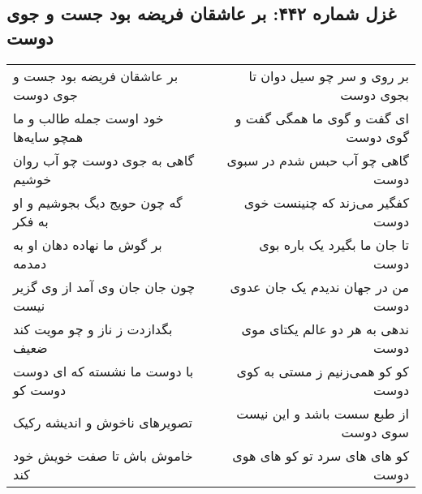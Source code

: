 \begin{center}
\section*{غزل شماره ۴۴۲: بر عاشقان فریضه بود جست و جوی دوست}
\label{sec:0442}
\begin{longtable}{l p{0.5cm} r}
بر عاشقان فریضه بود جست و جوی دوست
&&
بر روی و سر چو سیل دوان تا بجوی دوست
\\
خود اوست جمله طالب و ما همچو سایه‌ها
&&
ای گفت و گوی ما همگی گفت و گوی دوست
\\
گاهی به جوی دوست چو آب روان خوشیم
&&
گاهی چو آب حبس شدم در سبوی دوست
\\
گه چون حویج دیگ بجوشیم و او به فکر
&&
کفگیر می‌زند که چنینست خوی دوست
\\
بر گوش ما نهاده دهان او به دمدمه
&&
تا جان ما بگیرد یک باره بوی دوست
\\
چون جان جان وی آمد از وی گزیر نیست
&&
من در جهان ندیدم یک جان عدوی دوست
\\
بگدازدت ز ناز و چو مویت کند ضعیف
&&
ندهی به هر دو عالم یکتای موی دوست
\\
با دوست ما نشسته که ای دوست دوست کو
&&
کو کو همی‌زنیم ز مستی به کوی دوست
\\
تصویرهای ناخوش و اندیشه رکیک
&&
از طبع سست باشد و این نیست سوی دوست
\\
خاموش باش تا صفت خویش خود کند
&&
کو های های سرد تو کو های هوی دوست
\\
\end{longtable}
\end{center}
